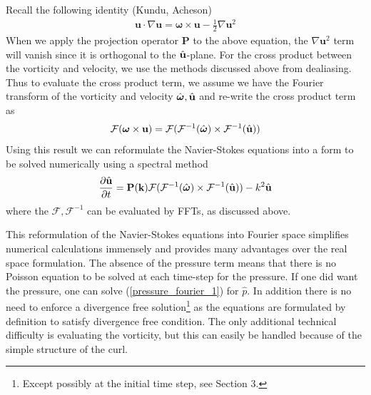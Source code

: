 Recall the following identity (Kundu, Acheson)
\begin{align}
\textbf{u}\cdot\nabla\textbf{u} = \bm{\omega}\times \textbf{u} - \frac{1}{2}\nabla \textbf{u}^{2}
\end{align}
When we apply the projection operator $\textbf{P}$ to the above equation, the $\nabla \textbf{u}^{2}$ term will vanish since it is orthogonal to the $\hat{\textbf{u}}$-plane. For the cross product between the vorticity and velocity, we use the methods discussed above from dealiasing. Thus to evaluate the cross product term, we assume we have the Fourier transform of the vorticity and velocity $\hat{\bm{\omega}},\hat{\textbf{u}}$ and re-write the cross product term as
\begin{align}
\mathcal{F}(\bm{\omega}\times \textbf{u}) = \mathcal{F}(\mathcal{F}^{-1}(\hat{\bm{\omega}})\times\mathcal{F}^{-1}(\hat{\textbf{u}}))
\end{align}
Using this result we can reformulate the Navier-Stokes equations into a form to be solved numerically using a spectral method
\begin{align}
\frac{\partial \hat{\textbf{u}}}{\partial t} = \textbf{P}(\textbf{k})\mathcal{F}(\mathcal{F}^{-1}(\hat{\bm{\omega}})\times\mathcal{F}^{-1}(\hat{\textbf{u}}))-k^{2}\hat{\textbf{u}}
\end{align}
where the $\mathcal{F},\mathcal{F}^{-1}$ can be evaluated by FFTs, as discussed above.

This reformulation of the Navier-Stokes equations into Fourier space simplifies numerical calculations immensely and provides many advantages over the real space formulation. The absence of the pressure term means that there is no Poisson equation to be solved at each time-step for the pressure. If one did want the pressure, one can solve (\ref{pressure_fourier_1}) for $\hat{p}$. In addition there is no need to enforce a divergence free solution\footnote{Except possibly at the initial time step, see Section 3.} as the equations are formulated by definition to satisfy divergence free condition. The only additional technical difficulty is evaluating the vorticity, but this can easily be handled because of the simple structure of the curl. 

